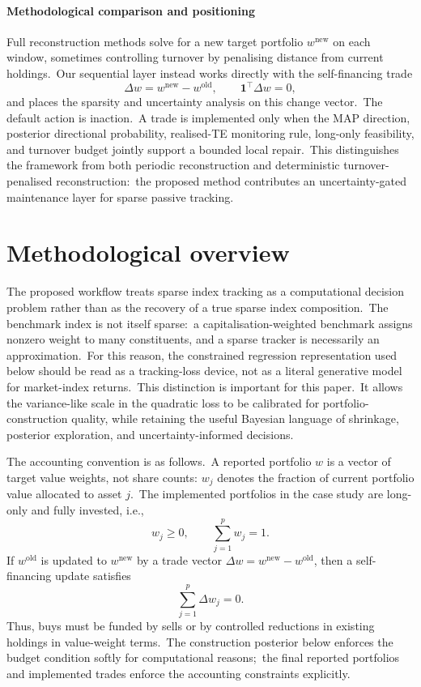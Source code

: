 \documentclass[11pt]{article}
\begin{document}
\paragraph{Methodological comparison and positioning}

Full reconstruction methods solve for a new target portfolio $w^{\mathrm{new}}$ on each window, sometimes controlling turnover by penalising distance from current holdings.\ Our sequential layer instead works directly with the self-financing trade
\[
    \Delta w = w^{\mathrm{new}} - w^{\mathrm{old}},\qquad \mathbf{1}^{\top}\Delta w=0,
\]
and places the sparsity and uncertainty analysis on this change vector.\ The default action is inaction.\ A trade is implemented only when the MAP direction, posterior directional probability, realised-TE monitoring rule, long-only feasibility, and turnover budget jointly support a bounded local repair.\ This distinguishes the framework from both periodic reconstruction and deterministic turnover-penalised reconstruction:\ the proposed method contributes an uncertainty-gated maintenance layer for sparse passive tracking.


\section{Methodological overview}\label{sec:methodological-overview}

The proposed workflow treats sparse index tracking as a computational decision problem rather than as the recovery of a true sparse index composition.\ The benchmark index is not itself sparse:\ a capitalisation-weighted benchmark assigns nonzero weight to many constituents, and a sparse tracker is necessarily an approximation.\ For this reason, the constrained regression representation used below should be read as a tracking-loss device, not as a literal generative model for market-index returns.\ This distinction is important for this paper.\ It allows the variance-like scale in the quadratic loss to be calibrated for portfolio-construction quality, while retaining the useful Bayesian language of shrinkage, posterior exploration, and uncertainty-informed decisions.

The accounting convention is as follows.\ A reported portfolio \(w\) is a vector of target value weights, not share counts: \(w_j\) denotes the fraction of current portfolio value allocated to asset \(j\).\ The implemented portfolios in
the case study are long-only and fully invested, i.e.,
\[
    w_j \ge 0, \qquad \sum_{j=1}^p w_j = 1.
\]
If \(w^{\mathrm{old}}\) is updated to \(w^{\mathrm{new}}\) by a trade vector
\(\Delta w = w^{\mathrm{new}}-w^{\mathrm{old}}\), then a self-financing update satisfies
\[
    \sum_{j=1}^p \Delta w_j = 0.
\]
Thus, buys must be funded by sells or by controlled reductions in existing holdings in value-weight terms.\ The construction posterior below enforces the budget condition softly for computational reasons;\ the final reported portfolios and implemented trades enforce the accounting constraints explicitly.
\end{document}

